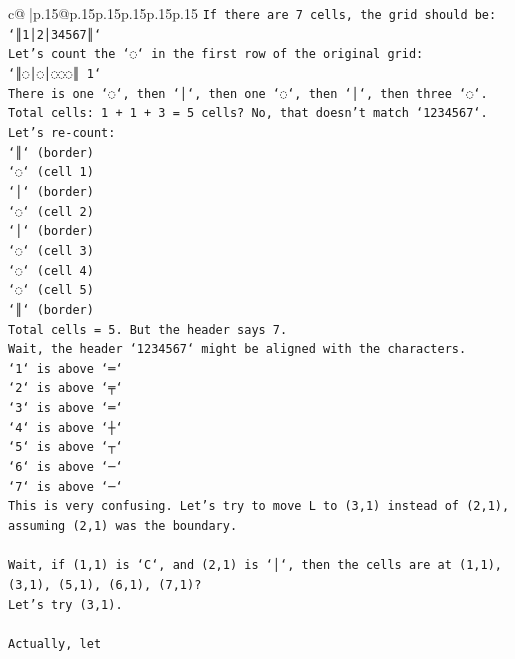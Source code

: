 \documentclass{article}
\begin{document}
{\begin{supertabular}{c@{$\;$}|p{.15\linewidth}@{}p{.15\linewidth}p{.15\linewidth}p{.15\linewidth}p{.15\linewidth}p{.15\linewidth}}
{{{\texttt{If there are 7 cells, the grid should be:} \\
\texttt{`║1│2│34567║`} \\
\texttt{Let's count the `◌` in the first row of the original grid:} \\
\texttt{`║◌│◌│◌◌◌║ 1`} \\
\texttt{There is one `◌`, then `│`, then one `◌`, then `│`, then three `◌`.} \\
\texttt{Total cells: 1 + 1 + 3 = 5 cells? No, that doesn't match `1234567`.} \\
\texttt{Let's re{-}count:} \\
\texttt{`║` (border)} \\
\texttt{`◌` (cell 1)} \\
\texttt{`│` (border)} \\
\texttt{`◌` (cell 2)} \\
\texttt{`│` (border)} \\
\texttt{`◌` (cell 3)} \\
\texttt{`◌` (cell 4)} \\
\texttt{`◌` (cell 5)} \\
\texttt{`║` (border)} \\
\texttt{Total cells = 5. But the header says 7.} \\
\texttt{Wait, the header `1234567` might be aligned with the characters.} \\
\texttt{`1` is above `═`} \\
\texttt{`2` is above `╤`} \\
\texttt{`3` is above `═`} \\
\texttt{`4` is above `┼`} \\
\texttt{`5` is above `┬`} \\
\texttt{`6` is above `─`} \\
\texttt{`7` is above `─`} \\
\texttt{This is very confusing. Let's try to move L to (3,1) instead of (2,1), assuming (2,1) was the boundary.} \\
\\ 
\texttt{Wait, if (1,1) is `C`, and (2,1) is `│`, then the cells are at (1,1), (3,1), (5,1), (6,1), (7,1)?} \\
\texttt{Let's try (3,1).} \\
\\ 
\texttt{Actually, let} \\
            }
        }
    }
     \\ \\


\end{supertabular}}
\end{document}
